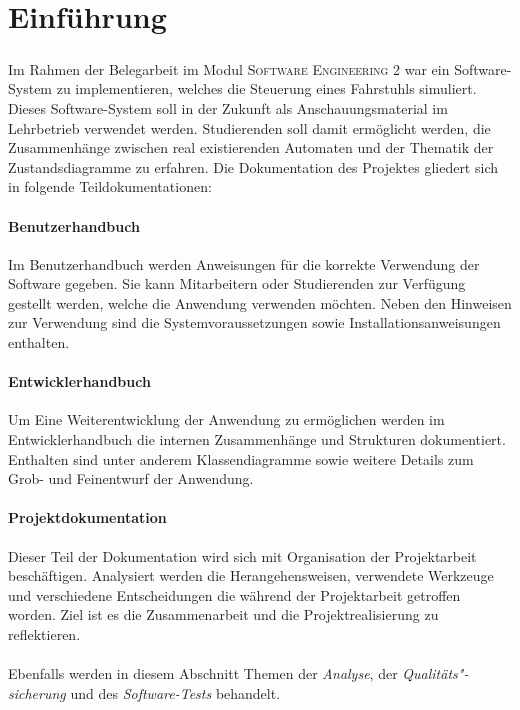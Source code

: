 \chapter{Einführung}
\paragraph{}
Im Rahmen der Belegarbeit im Modul \textsc{Software Engineering 2} war ein Software-System zu implementieren, welches die Steuerung eines Fahrstuhls simuliert. Dieses Software-System soll in der Zukunft als Anschauungsmaterial im Lehrbetrieb verwendet werden. Studierenden soll damit ermöglicht werden, die Zusammenhänge zwischen real existierenden Automaten und der Thematik der Zustandsdiagramme zu erfahren. Die Dokumentation des Projektes gliedert sich in folgende Teildokumentationen:

\subsubsection*{Benutzerhandbuch}
Im Benutzerhandbuch werden Anweisungen für die korrekte Verwendung der Software gegeben. Sie kann Mitarbeitern oder Studierenden zur Verfügung gestellt werden, welche die Anwendung verwenden möchten. Neben den Hinweisen zur Verwendung sind die Systemvoraussetzungen sowie Installationsanweisungen enthalten.

\subsubsection*{Entwicklerhandbuch}
Um Eine Weiterentwicklung der Anwendung zu ermöglichen werden im Entwicklerhandbuch die internen Zusammenhänge und Strukturen dokumentiert. Enthalten sind unter anderem Klassendiagramme sowie weitere Details zum Grob- und Feinentwurf der Anwendung.

\newpage
\subsubsection*{Projektdokumentation}
Dieser Teil der Dokumentation wird sich mit Organisation der Projektarbeit beschäftigen. Analysiert werden die Herangehensweisen, verwendete Werkzeuge und verschiedene Entscheidungen die während der Projektarbeit getroffen worden. Ziel ist es die Zusammenarbeit und die Projektrealisierung zu reflektieren. \\ \\Ebenfalls werden in diesem Abschnitt Themen der \textit{Analyse}, der \textit{Qualitäts"-sicherung} und des \textit{Software-Tests} behandelt.

